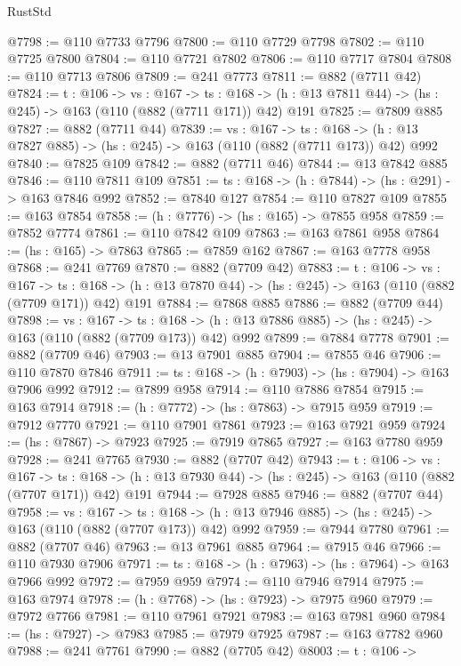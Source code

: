 \begin{lexlean}{RustStd}
\begin{coremodule}
@7798 := @110 @7733 @7796
@7800 := @110 @7729 @7798
@7802 := @110 @7725 @7800
@7804 := @110 @7721 @7802
@7806 := @110 @7717 @7804
@7808 := @110 @7713 @7806
@7809 := @241 @7773
@7811 := @882 (@7711 @42)
@7824 := {t : @106} ->
  {vs : @167} ->
  {ts : @168} -> (h : @13 @7811 @44) -> (hs : @245) -> @163 (@110 (@882 (@7711 @171)) @42) @191
@7825 := @7809 @885
@7827 := @882 (@7711 @44)
@7839 := {vs : @167} ->
  {ts : @168} -> (h : @13 @7827 @885) -> (hs : @245) -> @163 (@110 (@882 (@7711 @173)) @42) @992
@7840 := @7825 @109
@7842 := @882 (@7711 @46)
@7844 := @13 @7842 @885
@7846 := @110 @7811 @109
@7851 := {ts : @168} -> (h : @7844) -> (hs : @291) -> @163 @7846 @992
@7852 := @7840 @127
@7854 := @110 @7827 @109
@7855 := @163 @7854
@7858 := (h : @7776) -> (hs : @165) -> @7855 @958
@7859 := @7852 @7774
@7861 := @110 @7842 @109
@7863 := @163 @7861 @958
@7864 := (hs : @165) -> @7863
@7865 := @7859 @162
@7867 := @163 @7778 @958
@7868 := @241 @7769
@7870 := @882 (@7709 @42)
@7883 := {t : @106} ->
  {vs : @167} ->
  {ts : @168} -> (h : @13 @7870 @44) -> (hs : @245) -> @163 (@110 (@882 (@7709 @171)) @42) @191
@7884 := @7868 @885
@7886 := @882 (@7709 @44)
@7898 := {vs : @167} ->
  {ts : @168} -> (h : @13 @7886 @885) -> (hs : @245) -> @163 (@110 (@882 (@7709 @173)) @42) @992
@7899 := @7884 @7778
@7901 := @882 (@7709 @46)
@7903 := @13 @7901 @885
@7904 := @7855 @46
@7906 := @110 @7870 @7846
@7911 := {ts : @168} -> (h : @7903) -> (hs : @7904) -> @163 @7906 @992
@7912 := @7899 @958
@7914 := @110 @7886 @7854
@7915 := @163 @7914
@7918 := (h : @7772) -> (hs : @7863) -> @7915 @959
@7919 := @7912 @7770
@7921 := @110 @7901 @7861
@7923 := @163 @7921 @959
@7924 := (hs : @7867) -> @7923
@7925 := @7919 @7865
@7927 := @163 @7780 @959
@7928 := @241 @7765
@7930 := @882 (@7707 @42)
@7943 := {t : @106} ->
  {vs : @167} ->
  {ts : @168} -> (h : @13 @7930 @44) -> (hs : @245) -> @163 (@110 (@882 (@7707 @171)) @42) @191
@7944 := @7928 @885
@7946 := @882 (@7707 @44)
@7958 := {vs : @167} ->
  {ts : @168} -> (h : @13 @7946 @885) -> (hs : @245) -> @163 (@110 (@882 (@7707 @173)) @42) @992
@7959 := @7944 @7780
@7961 := @882 (@7707 @46)
@7963 := @13 @7961 @885
@7964 := @7915 @46
@7966 := @110 @7930 @7906
@7971 := {ts : @168} -> (h : @7963) -> (hs : @7964) -> @163 @7966 @992
@7972 := @7959 @959
@7974 := @110 @7946 @7914
@7975 := @163 @7974
@7978 := (h : @7768) -> (hs : @7923) -> @7975 @960
@7979 := @7972 @7766
@7981 := @110 @7961 @7921
@7983 := @163 @7981 @960
@7984 := (hs : @7927) -> @7983
@7985 := @7979 @7925
@7987 := @163 @7782 @960
@7988 := @241 @7761
@7990 := @882 (@7705 @42)
@8003 := {t : @106} ->

\end{coremodule}
\end{lexlean}
